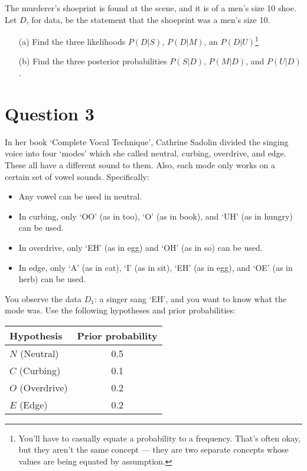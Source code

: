\documentclass[a4paper, 12pt]{article}
\begin{document}
The murderer's shoeprint is found at the scene, and it is
of a men's size 10 shoe. Let $D$, for data, be the statement that the
shoeprint was a men's size 10.

\begin{enumerate}
\item [(a)] Find the three likelihoods
$P(D|S)$, $P(D|M)$, an $P(D|U)$\footnote{You'll have to casually equate
a probability to a frequency. That's often okay, but they aren't the
same concept --- they are two separate concepts whose values are being
equated by assumption.}
\item [(b)] Find the three posterior probabilities $P(S|D)$, $P(M|D)$,
and $P(U|D)$.
\end{enumerate}


\section*{Question 3}
In her book `Complete Vocal Technique', Cathrine Sadolin divided
the singing voice into four `modes' which she called neutral, curbing, overdrive,
and edge. These all have a different sound to them. Also, each mode
only works on a certain set of vowel sounds.
Specifically:
\begin{itemize}
\item Any vowel can be used in neutral.
\item In curbing, only `OO' (as in too), `O' (as in book), and `UH' (as in hungry) can be used.
\item In overdrive, only `EH' (as in egg) and `OH' (as in so) can be used.
\item In edge, only `A' (as in cat), `I' (as in sit), `EH' (as in egg), and `OE' (as in herb) can be used.
\end{itemize}

You observe the data $D_1$: a singer sang `EH',
and you want to know what the mode was.
Use the following hypotheses and prior probabilities:

\begin{table}[!ht]
\centering
\begin{tabular}{|l|c|}
\hline
Hypothesis & Prior probability \\
\hline
$N$ (Neutral)   & 0.5 \\
$C$ (Curbing)   & 0.1 \\
$O$ (Overdrive) & 0.2 \\
$E$ (Edge)      & 0.2 \\
\hline
\end{tabular}
\end{table}
\end{document}
